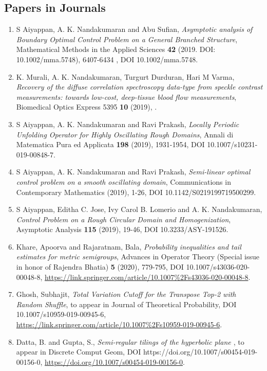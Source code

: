 
\subsection{Papers in Journals}

\begin{enumerate}
\item S Aiyappan, A. K. Nandakumaran and Abu Sufian, \emph{Asymptotic analysis of Boundary Optimal Control Problem on a General Branched Structure},  Mathematical Methods in the Applied Sciences {\bf 42} (2019. DOI: 10.1002/mma.5748), 6407-6434 , DOI 10.1002/mma.5748.
\item K. Murali, A. K. Nandakumaran, Turgurt Durduran, Hari M Varma, \emph{Recovery of the diffuse correlation spectroscopy data-type from speckle contrast measurements: towards low-cost, deep-tissue blood flow measurements}, Biomedical Optics Express 5395 {\bf 10} (2019), .
\item S Aiyappan, A. K. Nandakumaran and Ravi Prakash, \emph{Locally Periodic Unfolding Operator for Highly Oscillating Rough Domains}, Annali di Matematica Pura ed Applicata {\bf 198} (2019), 1931-1954, DOI 10.1007/s10231-019-00848-7.
\item S Aiyappan, A. K. Nandakumaran and Ravi Prakash, \emph{Semi-linear optimal control problem on a smooth oscillating domain}, Communications in Contemporary Mathematics {\bf } (2019), 1-26, DOI 10.1142/S0219199719500299.
\item S Aiyappan, Editha C. Jose, Ivy Carol B. Lomerio and A. K. Nandakumaran, \emph{ Control Problem on a Rough Circular Domain and Homogenization}, Asymptotic Analysis {\bf 115} (2019),  19-46, DOI 10.3233/ASY-191526.
\item Khare, Apoorva and Rajaratnam, Bala, \emph{Probability inequalities and tail estimates for metric semigroups}, Advances in Operator Theory (Special issue in honor of Rajendra Bhatia) {\bf 5} (2020), 779-795, DOI 10.1007/s43036-020-00048-8, \url{https://link.springer.com/article/10.1007%2Fs43036-020-00048-8}.
\item Ghosh, Subhajit, \emph{Total Variation Cutoff for the Transpose Top-2 with Random Shuffle}, to appear in Journal of Theoretical Probability, DOI 10.1007/s10959-019-00945-6, \url{https://link.springer.com/article/10.1007%2Fs10959-019-00945-6}.
\item Datta, B. and Gupta, S., \emph{Semi-regular tilings of the hyperbolic plane \label{bdsg_2019} }, to appear in Discrete Comput Geom, DOI https://doi.org/10.1007/s00454-019-00156-0, \url{https://doi.org/10.1007/s00454-019-00156-0}.

\end{enumerate}
